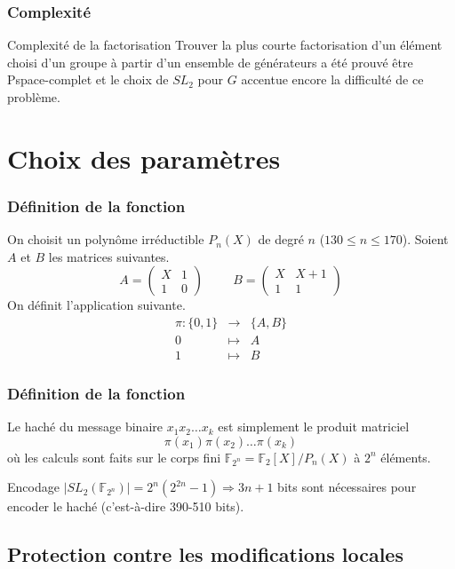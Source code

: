 \documentclass{beamer}
\newcommand{\F}{\mathbb{F}}
\begin{document}
\begin{frame}
 \frametitle{Complexité}
 \begin{block}{Complexité de la factorisation}
  Trouver la plus courte factorisation d'un élément choisi d'un groupe à partir d'un ensemble de générateurs
  a été prouvé être Pspace-complet et le choix de $SL_2$ pour $G$ accentue encore la difficulté de ce problème.
 \end{block}
\end{frame}

\section{Choix des paramètres}

\begin{frame}
 \frametitle{Définition de la fonction}
On choisit un polynôme irréductible $P_n(X)$ de degré $n$ ($130 \le n \le 170$).
Soient $A$ et $B$ les matrices suivantes.
$$ A = \begin{pmatrix} X & 1 \\ 1 & 0 \end{pmatrix} \hspace{1cm} B = \begin{pmatrix} X & X + 1 \\ 1 & 1 \end{pmatrix} $$
\pause
On définit l'application suivante.
\begin{eqnarray*}
\pi : \{0,1\} & \rightarrow & \{A,B\} \\
0 & \mapsto & A \\
1 & \mapsto &  B 
\end{eqnarray*}
\end{frame}

\begin{frame}
 \frametitle{Définition de la fonction}
Le haché du message binaire $x_1x_2 \ldots x_k$ est simplement le produit matriciel 
$$ \pi(x_1)\pi(x_2) \ldots \pi(x_k) $$
où les calculs sont faits sur le corps fini $\F_{2^n} = \F_2[X] / P_n(X)$ à $2^n$ éléments.
\pause
\begin{block}{Encodage}
 $|SL_2(\F_{2^n})| = 2^n(2^{2n} - 1) \Rightarrow 3n + 1$ bits sont nécessaires 
 pour encoder le haché (c'est-à-dire 390-510 bits).
\end{block}
\end{frame}

\subsection{Protection contre les modifications locales}
\end{document}
